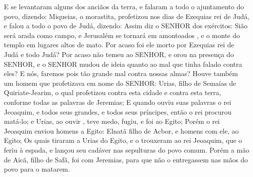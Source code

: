 {E se levantaram alguns dos anciãos da terra, e falaram a todo o ajuntamento do povo, dizendo:
Miqueias, o morastita, profetizou nos dias de Ezequias rei de Judá, e falou a todo o povo de Judá, dizendo: Assim diz o SENHOR dos exércitos: Sião será arada como campo, e Jerusalém se tornará em amontoados
{} , e o monte do templo em lugares altos de mato.
Por acaso foi ele morto por Ezequias rei de Judá e todo Judá? Por acaso
{} não temeu ao SENHOR, e orou na presença do SENHOR, e o SENHOR mudou de ideia quanto ao mal que tinha falado contra eles? E nós, faremos pois tão grande mal contra nossas
{} almas?
Houve também um homem que profetizava em nome do SENHOR: Urias, filho de Semaías de Quiriate-Jearim, o qual profetizou contra esta cidade e contra esta terra, conforme todas as palavras de Jeremias;
E quando ouviu suas palavras o rei Jeoaquim, e todos seus grandes, e todos seus príncipes, então o rei procurou matá-lo; e Urias, ao ouvir
{} , teve medo, fugiu, e foi ao Egito;
Porém o rei Jeoaquim enviou
{} homens a Egito: Elnatã filho de Acbor, e
{} homens com ele, ao Egito;
Os quais tiraram a Urias do Egito, e o trouxeram ao rei Jeoaquim, que o feriu à espada, e lançou seu cadáver nas sepulturas do povo comum.
Porém a mão de Aicã, filho de Safã, foi com Jeremias, para que não o entregassem nas mãos do povo para o matarem.

\par }

